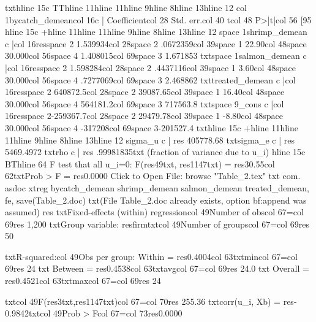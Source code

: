 {txt}{hline 15}{c TT}{hline 11}{hline 11}{hline 9}{hline 8}{hline 13}{hline 12}
{col 1}bycatch_demean{col 16}{c |} Coefficient{col 28}  Std. err.{col 40}      t{col 48}   P>|t|{col 56}     [95%
{hline 15}{c +}{hline 11}{hline 11}{hline 9}{hline 8}{hline 13}{hline 12}
{space 1}shrimp_demean {c |}{col 16}{res}{space 2} 1.539934{col 28}{space 2} .0672359{col 39}{space 1}   22.90{col 48}{space 3}0.000{col 56}{space 4} 1.408015{col 69}{space 3} 1.671853
{txt}{space 1}salmon_demean {c |}{col 16}{res}{space 2} 1.598284{col 28}{space 2} .4437116{col 39}{space 1}    3.60{col 48}{space 3}0.000{col 56}{space 4} .7277069{col 69}{space 3} 2.468862
{txt}treated_demean {c |}{col 16}{res}{space 2} 640872.5{col 28}{space 2} 39087.65{col 39}{space 1}   16.40{col 48}{space 3}0.000{col 56}{space 4} 564181.2{col 69}{space 3} 717563.8
{txt}{space 9}_cons {c |}{col 16}{res}{space 2}-259367.7{col 28}{space 2} 29479.78{col 39}{space 1}   -8.80{col 48}{space 3}0.000{col 56}{space 4}  -317208{col 69}{space 3}-201527.4
{txt}{hline 15}{c +}{hline 11}{hline 11}{hline 9}{hline 8}{hline 13}{hline 12}
       sigma_u {c |} {res} 405778.68
       {txt}sigma_e {c |} {res} 5469.4972
           {txt}rho {c |} {res} .99981835{txt}   (fraction of variance due to u_i)
{hline 15}{c BT}{hline 64}
F test that all u_i=0: F({res}49{txt}, {res}1147{txt}) = {res}30.55{col 62}{txt}Prob > F = {res}0.0000
Click to Open File:  {browse "Table_2.tex"}
{txt}
{com}. asdoc xtreg bycatch_demean shrimp_demean salmon_demean treated_demean, fe, save(Table_2.doc)
{txt}(File Table_2.doc already exists, option {bf:append} was assumed)
{res}
{txt}Fixed-effects (within) regression{col 49}Number of obs{col 67}={col 69}{res}     1,200
{txt}Group variable: {res}firm{txt}{col 49}Number of groups{col 67}={col 69}{res}        50

{txt}R-squared:{col 49}Obs per group:
     Within  = {res}0.4004{col 63}{txt}min{col 67}={col 69}{res}        24
{txt}     Between = {res}0.4538{col 63}{txt}avg{col 67}={col 69}{res}      24.0
{txt}     Overall = {res}0.4521{col 63}{txt}max{col 67}={col 69}{res}        24

{txt}{col 49}F({res}3{txt},{res}1147{txt}){col 67}={col 70}{res}   255.36
{txt}corr(u_i, Xb) = {res}-0.9842{txt}{col 49}Prob > F{col 67}={col 73}{res}0.0000


